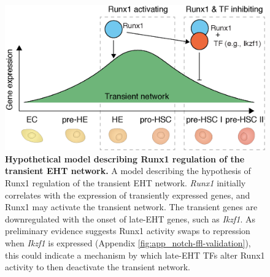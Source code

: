 \begin{figure}[!t]
    \centering
    \includegraphics[width=\textwidth,height=\textheight,keepaspectratio]{figures/models/ch6_model-runx1-transient.png}
    \caption[{Hypothetical model describing Runx1 regulation of the transient EHT network.}]
    {\textbf{Hypothetical model describing Runx1 regulation of the transient EHT network.}
    A model describing the hypothesis of Runx1 regulation of the transient EHT network. \textit{Runx1} initially correlates with the expression of transiently expressed genes, and Runx1 may activate the transient network. The transient genes are downregulated with the onset of late-EHT genes, such as \textit{Ikzf1}. As preliminary evidence suggests Runx1 activity swaps to repression when \textit{Ikzf1} is expressed (Appendix \ref{fig:app_notch-ffl-validation}), this could indicate a mechanism by which late-EHT TFs alter Runx1 activity to then deactivate the transient network.
    }
    \label{fig:ch6_model-runx1-transient}
\end{figure}

